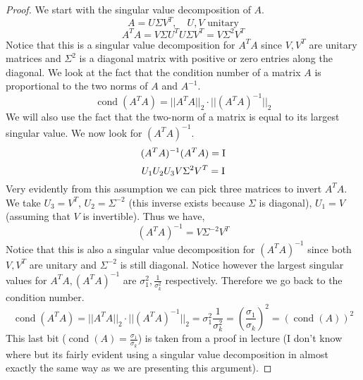 \documentclass{article}
\DeclareMathOperator{\cond}{cond}
\begin{document}
\begin{enumerate}
    \begin{proof}
        We start with the singular value decomposition of $A$. 
        \[
            A = U\Sigma V^T, \quad U, V \text{ unitary}
        \]
        \[
            A^TA = V\Sigma U^T U \Sigma V^T = V\Sigma^2V^T
        \]
        Notice that this is a singular value decomposition for $A^TA$ since $V, V^T$ are unitary matrices and $\Sigma^2$ is a diagonal matrix with positive or zero entries along the diagonal. We look at the fact that the condition number of a matrix $A$ is  proportional to the two norms of $A$ and $A^{-1}$. 
        \[
            \cond(A^TA) = ||A^TA||_2 \cdot ||(A^TA)^{-1}||_2
        \]
        We will also use the fact that the two-norm of a matrix is equal to its largest singular value. We now look for $(A^TA)^{-1}$. 
        \[
            (A^TA)^{-1} (A^TA) = \mathrm{I}
        \]
        \[
            U_1U_2U_3 V \Sigma^2V^T = \mathrm{I}
        \]
        Very evidently from this assumption we can pick three matrices to invert $A^TA$. We take $U_3 = V^T$, $U_2 = \Sigma^{-2}$ (this inverse exists because $\Sigma$ is diagonal), $U_1 = V$ (assuming that $V$ is invertible). Thus we have, 
        \[
            (A^TA)^{-1} = V\Sigma^{-2}V^T
        \]
        Notice that this is also a singular value decomposition for $(A^TA)^{-1}$ since both $V, V^T$ are unitary and $\Sigma^{-2}$ is still diagonal. Notice however the largest singular values for $A^TA, (A^TA)^{-1}$ are $\sigma_1^2, \frac{1}{\sigma_k^2}$ respectively. Therefore we go back to the condition number. 
        \[
            \cond(A^TA) = ||A^TA||_2 \cdot ||(A^TA)^{-1}||_2 = \sigma_1^2 \frac{1}{\sigma_k^2} = \left(\frac{\sigma_1}{\sigma_k}\right)^2 = \left(\cond(A)\right)^2
        \]  
        This last bit ($\cond(A) = \frac{\sigma_1}{\sigma_k}$) is taken from a proof in lecture (I don't know where but its fairly evident using a singular value decomposition in almost exactly the same way as we are presenting this argument). 
   \end{proof}

\end{enumerate}
\end{document}
